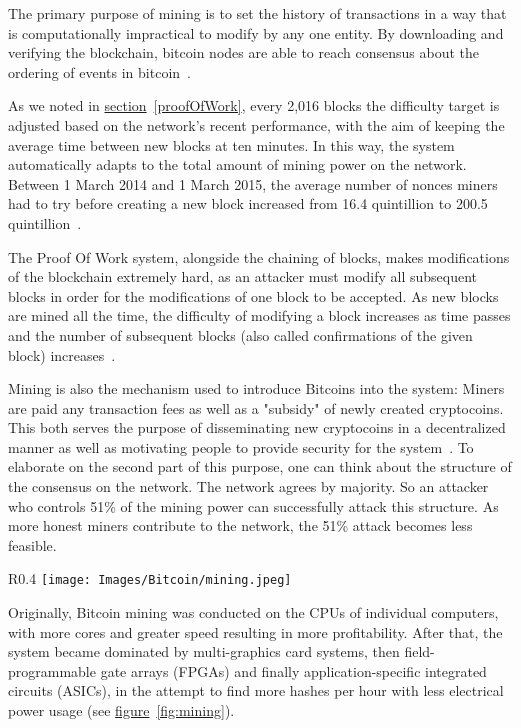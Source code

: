 The primary purpose of mining is to set the history of transactions in a way that is computationally impractical to modify by any one entity. By downloading and verifying the blockchain, bitcoin nodes are able to reach consensus about the ordering of events in bitcoin~\cite{wiki}.

As we noted in \hyperref[proofOfWork]{section}~\ref{proofOfWork}, every 2,016 blocks the difficulty target is adjusted based on the network's recent performance, with the aim of keeping the average time between new blocks at ten minutes. In this way, the system automatically adapts to the total amount of mining power on the network. Between 1 March 2014 and 1 March 2015, the average number of nonces miners had to try before creating a new block increased from 16.4 quintillion to 200.5 quintillion~\cite{difficulty_history}.

The Proof Of Work system, alongside the chaining of blocks, makes modifications of the blockchain extremely hard, as an attacker must modify all subsequent blocks in order for the modifications of one block to be accepted. As new blocks are mined all the time, the difficulty of modifying a block increases as time passes and the number of subsequent blocks (also called confirmations of the given block) increases~\cite{economist}.

Mining is also the mechanism used to introduce Bitcoins into the system: Miners are paid any transaction fees as well as a "subsidy" of newly created cryptocoins. This both serves the purpose of disseminating new cryptocoins in a decentralized manner as well as motivating people to provide security for the system~\cite{wiki}. To elaborate on the second part of this purpose, one can think about the structure of the consensus on the network. The network agrees by majority. So an attacker who controls 51\% of the mining power can successfully attack this structure. As more honest miners contribute to the network, the 51\% attack becomes less feasible.

\begin{wrapfigure}{R}{0.4\textwidth}
  \centering
  \texttt{[image: Images/Bitcoin/mining.jpeg]}
  \caption{Mining options}
  \label{fig:mining}
\end{wrapfigure}
Originally, Bitcoin mining was conducted on the CPUs of individual computers, with more cores and greater speed resulting in more profitability. After that, the system became dominated by multi-graphics card systems, then field-programmable gate arrays (FPGAs) and finally application-specific integrated circuits (ASICs), in the attempt to find more hashes per hour with less electrical power usage (see \hyperref[fig:mining]{figure}~\ref{fig:mining}).

